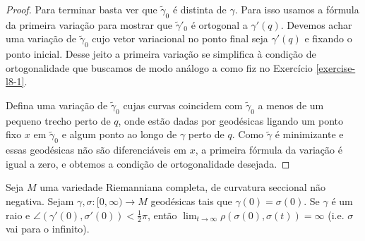 \begin{proof}
Para terminar basta ver que $\tilde{\gamma}_0$ é distinta de $\gamma$. Para isso
usamos a fórmula da primeira variação para mostrar que $\tilde{\gamma}'_0$ é
ortogonal a $\gamma'(q)$. Devemos achar uma variação de $\tilde{\gamma}_0$ cujo
vetor variacional no ponto final seja $\gamma'(q)$ e fixando o ponto inicial.
Desse jeito a primeira variação se simplifica à condição de ortogonalidade que
buscamos de modo análogo a como fiz no Exercício \ref{exercise-l8-1}.

Defina uma variação de $\tilde{\gamma}_0$ cujas curvas coincidem com
$\tilde{\gamma}_0$ a menos de um pequeno trecho perto de $q$, onde estão dadas
por geodésicas ligando um ponto fixo $x$ em $\tilde{\gamma}_0$ e algum ponto ao
longo de $\gamma$ perto de $q$. Como $\tilde{\gamma}$ é minimizante e essas
geodésicas não são diferenciáveis em $x$, a primeira fórmula da variação é igual
a zero, e obtemos a condição de ortogonalidade desejada.
\end{proof}

\begin{exercise}
\label{exercise-l8-11}
Seja $M$ uma variedade Riemanniana completa, de curvatura seccional não
negativa. Sejam $\gamma,\sigma:[0,\infty) \to M$ geodésicas tais que
$\gamma(0)=\sigma(0)$. Se $\gamma$ é um raio e
$\angle(\gamma'(0),\sigma'(0))<\frac{1}{2}\pi$, então $\lim_{t \to \infty}
\rho(\sigma(0),\sigma(t))=\infty$ (i.e. $\sigma$ vai para o infinito).
\end{exercise}

